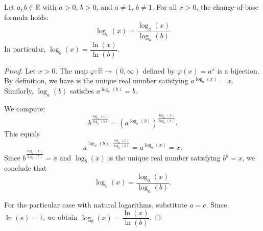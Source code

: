 \begin{proposition} \label{proposition:change_of_base_formula_for_real_logarithms}
    Let $a, b \in \mathbb{R}$ with $a > 0$, $b > 0$, and $a \neq 1$, $b \neq 1$. For all $x > 0$, the change-of-base formula holds:
    $$\log_b(x) = \frac{\log_a(x)}{\log_a(b)}$$
    In particular, $\log_b(x) = \dfrac{\ln(x)}{\ln(b)}$.
\end{proposition}

\begin{proof}
    Let $x > 0$. The map $\varphi : \mathbb{R} \to (0, \infty)$ defined by $\varphi(x) = a^x$ is a bijection. By definition, we have  is the unique real number satisfying $a^{\log_a(x)} = x$. Similarly, $\log_a(b)$ satisfies $a^{\log_a(b)} = b$.

    We compute:
    $$b^{\frac{\log_a(x)}{\log_a(b)}} = \left(a^{\log_a(b)}\right)^{\frac{\log_a(x)}{\log_a(b)}}.$$
    This equals
    $$a^{\log_a(b) \cdot \frac{\log_a(x)}{\log_a(b)}} = a^{\log_a(x)} = x.$$
    Since $b^{\frac{\log_a(x)}{\log_a(b)}} = x$ and $\log_b(x)$ is the unique real number satisfying $b^y = x$, we conclude that
    $$\log_b(x) = \frac{\log_a(x)}{\log_a(b)}.$$

    For the particular case with natural logarithms, substitute $a = e$. Since $\ln(e) = 1$, we obtain $\log_b(x) = \dfrac{\ln(x)}{\ln(b)}$.
\end{proof}
